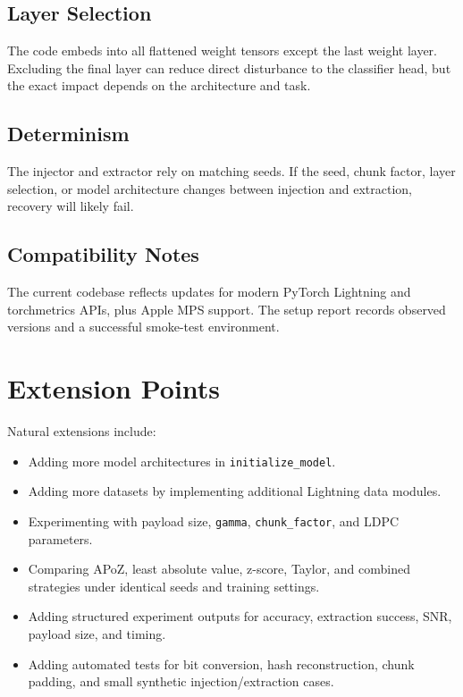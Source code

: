\documentclass[11pt,a4paper]{article}
\newcommand{\code}[1]{\texttt{#1}}
\begin{document}
\subsection{Layer Selection}

The code embeds into all flattened weight tensors except the last weight layer. Excluding the final layer can reduce direct disturbance to the classifier head, but the exact impact depends on the architecture and task.

\subsection{Determinism}

The injector and extractor rely on matching seeds. If the seed, chunk factor, layer selection, or model architecture changes between injection and extraction, recovery will likely fail.

\subsection{Compatibility Notes}

The current codebase reflects updates for modern PyTorch Lightning and torchmetrics APIs, plus Apple MPS support. The setup report records observed versions and a successful smoke-test environment.

\section{Extension Points}

Natural extensions include:

\begin{itemize}[leftmargin=1.4em]
  \item Adding more model architectures in \code{initialize\_model}.
  \item Adding more datasets by implementing additional Lightning data modules.
  \item Experimenting with payload size, \code{gamma}, \code{chunk\_factor}, and LDPC parameters.
  \item Comparing APoZ, least absolute value, z-score, Taylor, and combined strategies under identical seeds and training settings.
  \item Adding structured experiment outputs for accuracy, extraction success, SNR, payload size, and timing.
  \item Adding automated tests for bit conversion, hash reconstruction, chunk padding, and small synthetic injection/extraction cases.
\end{itemize}
\end{document}
